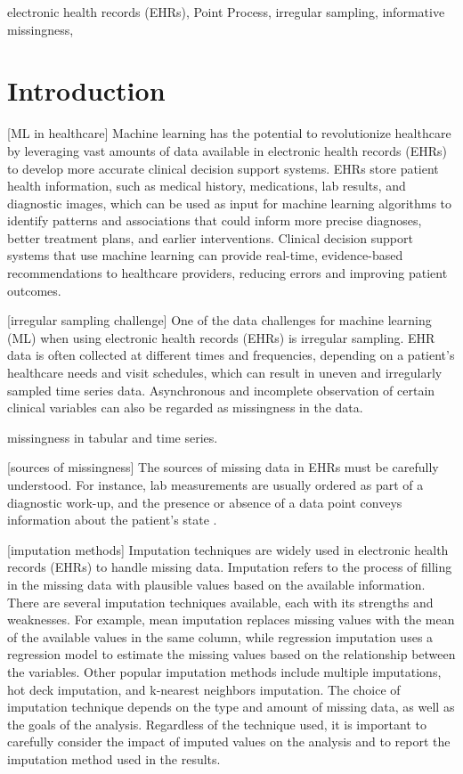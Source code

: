 \documentclass[journal,twoside,web]{ieeecolor}
\begin{document}
\begin{IEEEkeywords}
    electronic health records (EHRs), Point Process, irregular sampling, informative missingness,
\end{IEEEkeywords}


\section{Introduction}
\label{sec:intro}

[ML in healthcare] Machine learning has the potential to revolutionize healthcare by leveraging vast amounts of data available in electronic health records (EHRs) to develop more accurate clinical decision support systems. EHRs store patient health information, such as medical history, medications, lab results, and diagnostic images, which can be used as input for machine learning algorithms to identify patterns and associations that could inform more precise diagnoses, better treatment plans, and earlier interventions. Clinical decision support systems that use machine learning can provide real-time, evidence-based recommendations to healthcare providers, reducing errors and improving patient outcomes.

[irregular sampling challenge] One of the data challenges for machine learning (ML) when using electronic health records (EHRs) is irregular sampling. EHR data is often collected at different times and frequencies, depending on a patient's healthcare needs and visit schedules, which can result in uneven and irregularly sampled time series data. Asynchronous and incomplete observation of certain clinical variables can also be regarded as missingness in the data.

missingness in tabular and time series.

[sources of missingness] The sources of missing data in EHRs must be carefully understood. For instance, lab measurements are usually ordered as part of a diagnostic work-up, and the presence or absence of a data point conveys information about the patient's state \cite*{ghassemiReviewChallengesOpportunities2020}.

[imputation methods] Imputation techniques are widely used in electronic health records (EHRs) to handle missing data. Imputation refers to the process of filling in the missing data with plausible values based on the available information. There are several imputation techniques available, each with its strengths and weaknesses. For example, mean imputation replaces missing values with the mean of the available values in the same column, while regression imputation uses a regression model to estimate the missing values based on the relationship between the variables. Other popular imputation methods include multiple imputations, hot deck imputation, and k-nearest neighbors imputation. The choice of imputation technique depends on the type and amount of missing data, as well as the goals of the analysis. Regardless of the technique used, it is important to carefully consider the impact of imputed values on the analysis and to report the imputation method used in the results.
\end{document}
